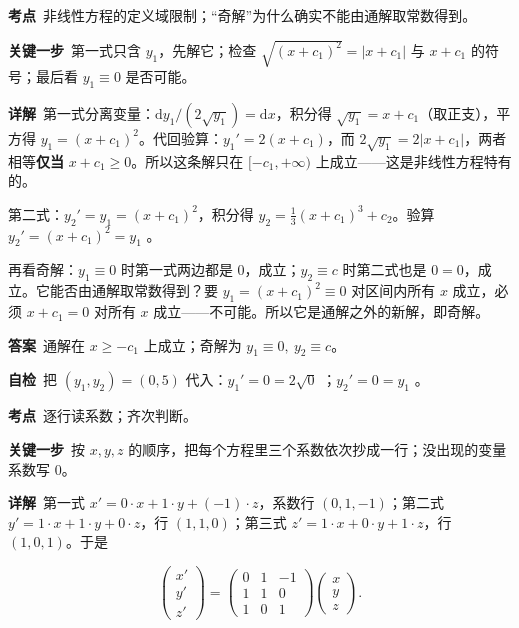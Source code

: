\documentclass[11pt]{ctexart}
\renewcommand{\qbreak}{\needspace{0.26\textheight}}
\newcommand{\qpagebreak}{\needspace{0.92\textheight}}
\newcommand{\mat}[1]{\begin{pmatrix}#1\end{pmatrix}}
\begin{document}
\qbreak
{}

\textbf{考点}\ 非线性方程的定义域限制；“奇解”为什么确实不能由通解取常数得到。

\textbf{关键一步}\ 第一式只含 $y_1$，先解它；检查 $\sqrt{(x+c_1)^2}=|x+c_1|$ 与 $x+c_1$ 的符号；最后看 $y_1\equiv0$ 是否可能。

\textbf{详解}\ 第一式分离变量：$\mathrm{d}y_1/(2\sqrt{y_1})=\mathrm{d}x$，积分得 $\sqrt{y_1}=x+c_1$（取正支），平方得 $y_1=(x+c_1)^2$。代回验算：$y_1'=2(x+c_1)$，而 $2\sqrt{y_1}=2|x+c_1|$，两者相等\textbf{仅当} $x+c_1\ge0$。所以这条解只在 $[-c_1,+\infty)$ 上成立——这是非线性方程特有的。

第二式：$y_2'=y_1=(x+c_1)^2$，积分得 $y_2=\tfrac13(x+c_1)^3+c_2$。验算 $y_2'=(x+c_1)^2=y_1$ 。

再看奇解：$y_1\equiv0$ 时第一式两边都是 $0$，成立；$y_2\equiv c$ 时第二式也是 $0=0$，成立。它能否由通解取常数得到？要 $y_1=(x+c_1)^2\equiv0$ 对区间内所有 $x$ 成立，必须 $x+c_1=0$ 对所有 $x$ 成立——不可能。所以它是通解之外的新解，即奇解。

\textbf{答案}\ 通解在 $x\ge-c_1$ 上成立；奇解为 $y_1\equiv0,\ y_2\equiv c$。

\textbf{自检}\ 把 $(y_1,y_2)=(0,5)$ 代入：$y_1'=0=2\sqrt0$ ；$y_2'=0=y_1$ 。

\qpagebreak
{}
\label{c1:app:a3}

\qbreak
{}

\textbf{考点}\ 逐行读系数；齐次判断。

\textbf{关键一步}\ 按 $x,y,z$ 的顺序，把每个方程里三个系数依次抄成一行；没出现的变量系数写 $0$。

\textbf{详解}\ 第一式 $x'=0\cdot x+1\cdot y+(-1)\cdot z$，系数行 $(0,1,-1)$；第二式 $y'=1\cdot x+1\cdot y+0\cdot z$，行 $(1,1,0)$；第三式 $z'=1\cdot x+0\cdot y+1\cdot z$，行 $(1,0,1)$。于是

\[
\mat{x'\\ y'\\ z'}=\mat{0&1&-1\\ 1&1&0\\ 1&0&1}\mat{x\\ y\\ z}.
\]
\end{document}
